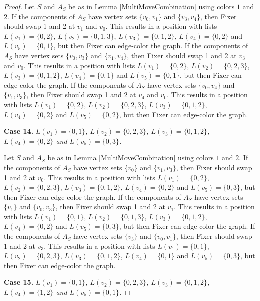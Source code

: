 \documentclass[12pt]{amsart}
\theoremstyle{plain}
\theoremstyle{definition}
\theoremstyle{remark}
\begin{document}
\begin{proof}
Let $S$ and $A_S$ be as in Lemma \ref{MultiMoveCombination} using colors $1$ and $2$. If the components of $A_S$ have vertex sets $\{v_0, v_1\}$ and $\{v_3, v_4\}$, then Fixer should swap 1 and 2 at $v_1$ and $v_0$. This results in a position with lists $L(v_1) = \{0, 2\}$, $L(v_2) = \{0, 1, 3\}$, $L(v_3) = \{0, 1, 2\}$, $L(v_4) = \{0, 2\}$ and $L(v_5) = \{0, 1\}$, but then Fixer can edge-color the graph.
If the components of $A_S$ have vertex sets $\{v_0, v_3\}$ and $\{v_1, v_4\}$, then Fixer should swap 1 and 2 at $v_3$ and $v_0$. This results in a position with lists $L(v_1) = \{0, 2\}$, $L(v_2) = \{0, 2, 3\}$, $L(v_3) = \{0, 1, 2\}$, $L(v_4) = \{0, 1\}$ and $L(v_5) = \{0, 1\}$, but then Fixer can edge-color the graph.
If the components of $A_S$ have vertex sets $\{v_0, v_4\}$ and $\{v_1, v_3\}$, then Fixer should swap 1 and 2 at $v_4$ and $v_0$. This results in a position with lists $L(v_1) = \{0, 2\}$, $L(v_2) = \{0, 2, 3\}$, $L(v_3) = \{0, 1, 2\}$, $L(v_4) = \{0, 2\}$ and $L(v_5) = \{0, 2\}$, but then Fixer can edge-color the graph.

\noindent\textbf{Case 14.  }\textit{$L(v_1) = \{0, 1\}$, $L(v_2) = \{0, 2, 3\}$, $L(v_3) = \{0, 1, 2\}$, $L(v_4) = \{0, 2\}$ and $L(v_5) = \{0, 3\}$.}

Let $S$ and $A_S$ be as in Lemma \ref{MultiMoveCombination} using colors $1$ and $2$. If the components of $A_S$ have vertex sets $\{v_0\}$ and $\{v_1, v_3\}$, then Fixer should swap 1 and 2 at $v_0$. This results in a position with lists $L(v_1) = \{0, 2\}$, $L(v_2) = \{0, 2, 3\}$, $L(v_3) = \{0, 1, 2\}$, $L(v_4) = \{0, 2\}$ and $L(v_5) = \{0, 3\}$, but then Fixer can edge-color the graph.
If the components of $A_S$ have vertex sets $\{v_1\}$ and $\{v_0, v_3\}$, then Fixer should swap 1 and 2 at $v_1$. This results in a position with lists $L(v_1) = \{0, 1\}$, $L(v_2) = \{0, 1, 3\}$, $L(v_3) = \{0, 1, 2\}$, $L(v_4) = \{0, 2\}$ and $L(v_5) = \{0, 3\}$, but then Fixer can edge-color the graph.
If the components of $A_S$ have vertex sets $\{v_3\}$ and $\{v_0, v_1\}$, then Fixer should swap 1 and 2 at $v_3$. This results in a position with lists $L(v_1) = \{0, 1\}$, $L(v_2) = \{0, 2, 3\}$, $L(v_3) = \{0, 1, 2\}$, $L(v_4) = \{0, 1\}$ and $L(v_5) = \{0, 3\}$, but then Fixer can edge-color the graph.

\noindent\textbf{Case 15.  }\textit{$L(v_1) = \{0, 1\}$, $L(v_2) = \{0, 2, 3\}$, $L(v_3) = \{0, 1, 2\}$, $L(v_4) = \{1, 2\}$ and $L(v_5) = \{0, 1\}$.}


\end{proof}
\end{document}
